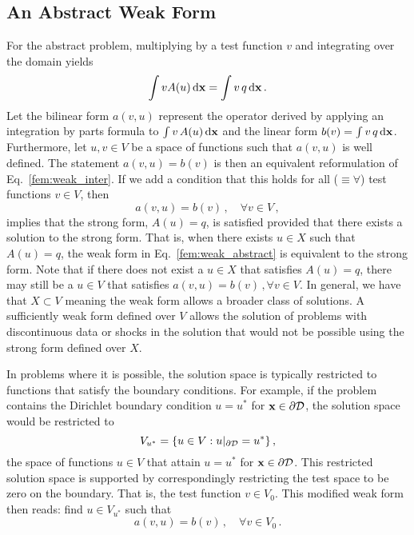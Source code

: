 \documentclass[../doc.tex]{subfiles}
\begin{document}
\subsection{An Abstract Weak Form}
For the abstract problem, multiplying by a test function $v$ and integrating over the domain yields 
	\begin{equation} \label{fem:weak_inter}
		\int v A(u) \mathop{}\!\mathrm{d} \boldsymbol{\mathrm{x}} = \int v\, q \mathop{}\!\mathrm{d} \boldsymbol{\mathrm{x}} \,.
	\end{equation}
Let the bilinear form $a(v,u)$ represent the operator derived by applying an integration by parts formula to $\int v\,A(u) \mathop{}\!\mathrm{d} \boldsymbol{\mathrm{x}}$ and the linear form $b(v) = \int v \, q \mathop{}\!\mathrm{d} \boldsymbol{\mathrm{x}}$. Furthermore, let $u,v \in V$ be a space of functions such that $a(v,u)$ is well defined. The statement $a(v,u) = b(v)$ is then an equivalent reformulation of Eq.~\ref{fem:weak_inter}. 
If we add a condition that this holds for all ($\equiv \forall$) test functions $v\in V$, then 
	\begin{equation} \label{fem:weak_abstract}
		a(v,u) = b(v) \,, \quad \forall v \in V\,,
	\end{equation}
implies that the strong form, $A(u) = q$, is satisfied provided that there exists a solution to the strong form. That is, when there exists $u \in X$ such that $A(u) = q$, the weak form in Eq.~\ref{fem:weak_abstract} is equivalent to the strong form. Note that if there does not exist a $u \in X$ that satisfies $A(u) = q$, there may still be a $u \in V$ that satisfies $a(v,u) = b(v)\,, \forall v \in V$. In general, we have that $X \subset V$ meaning the weak form allows a broader class of solutions. A sufficiently weak form defined over $V$ allows the solution of problems with discontinuous data or shocks in the solution that would not be possible using the strong form defined over $X$. 

In problems where it is possible, the solution space is typically restricted to functions that satisfy the boundary conditions. For example, if the problem contains the Dirichlet boundary condition $u = u^*$ for $\boldsymbol{\mathrm{x}} \in \partial\mathcal{D}$, the solution space would be restricted to 
	\begin{equation}
		V_{u^*} = \{ u \in V : u|_{\partial\mathcal{D}} = u^* \} \,, 
	\end{equation}
the space of functions $u\in V$ that attain $u = u^*$ for $\boldsymbol{\mathrm{x}} \in \partial\mathcal{D}$. 
This restricted solution space is supported by correspondingly restricting the test space to be zero on the boundary. That is, the test function $v \in V_0$. This modified weak form then reads: find $u \in V_{u^*}$ such that 
	\begin{equation}
		a(v,u) = b(v) \,, \quad \forall v \in V_0 \,. 
	\end{equation}
\end{document}

